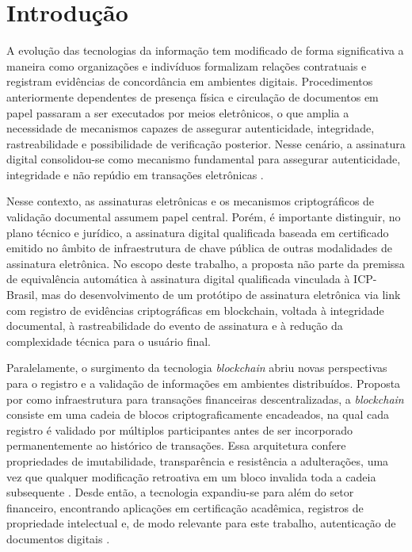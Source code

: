 \documentclass[
    12pt,
    a4paper,
    oneside,
    chapter=TITLE,
    section=TITLE,
    subsection=TITLE,
    subsubsection=TITLE,
    sumario=tradicional,
    english,
    brazil
]{abntex2}
\begin{document}
\tableofcontents*
\cleardoublepage

\textual

\chapter{Introdução}

A evolução das tecnologias da informação tem modificado de forma
significativa a maneira como organizações e indivíduos formalizam
relações contratuais e registram evidências de concordância em
ambientes digitais. Procedimentos anteriormente dependentes de
presença física e circulação de documentos em papel passaram a ser
executados por meios eletrônicos, o que amplia a necessidade de
mecanismos capazes de assegurar autenticidade, integridade,
rastreabilidade e possibilidade de verificação posterior. Nesse
cenário, a assinatura digital consolidou-se como mecanismo
fundamental para assegurar autenticidade, integridade e não repúdio
em transações eletrônicas \cite{stallings2017}.

Nesse contexto, as assinaturas eletrônicas e os mecanismos
criptográficos de validação documental assumem papel central. Porém,
é importante distinguir, no plano técnico e jurídico, a assinatura
digital qualificada baseada em certificado emitido no âmbito de
infraestrutura de chave pública de outras modalidades de assinatura
eletrônica. No escopo deste trabalho, a proposta não parte da
premissa de equivalência automática à assinatura digital qualificada
vinculada à ICP-Brasil, mas do desenvolvimento de um protótipo de
assinatura eletrônica via link com registro de evidências
criptográficas em blockchain, voltada à integridade documental, à
rastreabilidade do evento de assinatura e à redução da complexidade
técnica para o usuário final.

Paralelamente, o surgimento da tecnologia \emph{blockchain} abriu
novas perspectivas para o registro e a validação de informações em
ambientes distribuídos. Proposta por  como
infraestrutura para transações financeiras descentralizadas, a
\emph{blockchain} consiste em uma cadeia de blocos criptograficamente
encadeados, na qual cada registro é validado por múltiplos
participantes antes de ser incorporado permanentemente ao histórico
de transações. Essa arquitetura confere propriedades de
imutabilidade, transparência e resistência a adulterações, uma vez
que qualquer modificação retroativa em um bloco invalida toda a
cadeia subsequente \cite{nakamoto2008}. Desde então, a tecnologia
expandiu-se para além do setor financeiro, encontrando aplicações em
certificação acadêmica, registros de propriedade intelectual e, de
modo relevante para este trabalho, autenticação de documentos
digitais \cite{zheng2018}.
\end{document}
